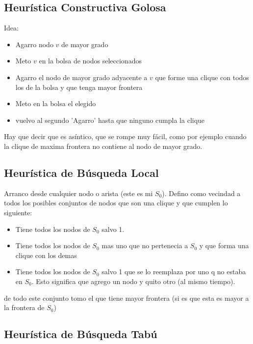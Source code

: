 \subsection{Heurística Constructiva Golosa}
Idea:
\begin{itemize}
\item Agarro nodo $v$ de mayor grado
\item Meto $v$ en la bolsa de nodos seleccionados
\item Agarro el nodo de mayor grado adyacente a $v$ que forme una clique con todos los de la bolsa y que tenga mayor frontera
\item Meto en la bolsa el elegido
\item vuelvo al segundo 'Agarro' hasta que ninguno cumpla la clique
\end{itemize}


Hay que decir que es asíntico, que se rompe muy fácil, como por ejemplo cuando la clique de maxima frontera no contiene al nodo de mayor grado.

\subsection{Heurística de Búsqueda Local}

Arranco desde cualquier nodo o arista (este es mi $S_{0}$). Defino como vecindad a todos los posibles conjuntos de nodos que son una clique y que cumplen lo siguiente:
\begin{itemize}
\item Tiene todos los nodos de $S_{0}$ salvo 1.
\item Tiene todos los nodos de $S_{0}$ mas uno que no pertenecia a $S_{0}$ y que forma una clique con los demas 
\item Tiene todos los nodos de $S_{0}$ salvo 1 que se lo reemplaza por uno q no estaba en $S_{0}$. Esto significa que agrego un nodo y quito otro (al mismo tiempo).
\end{itemize}

de todo este conjunto tomo el que tiene mayor frontera (si es que esta es mayor a la frontera de $S_{0}$)



\subsection{Heurística de Búsqueda Tabú}

